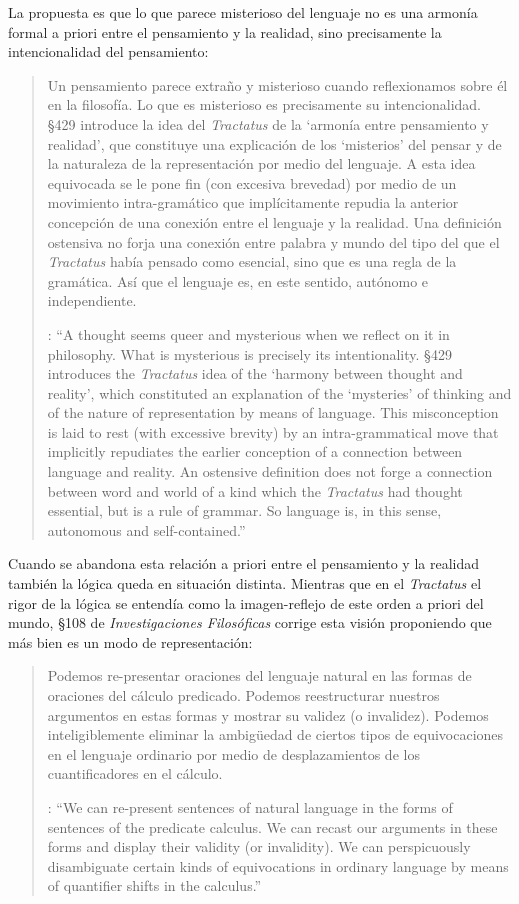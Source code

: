 La propuesta es que lo que parece misterioso del lenguaje no es una armonía formal a priori entre el pensamiento y la realidad, sino precisamente la intencionalidad del pensamiento: \blockquote[{\cite[4]{hacker2000mind}}: \enquote{A thought seems queer and mysterious when we reflect on it in philosophy. What is mysterious is precisely its intentionality. \S429 introduces the \emph{Tractatus} idea of the `harmony between thought and reality', which constituted an explanation of the `mysteries' of thinking and of the nature of representation by means of language. This misconception is laid to rest (with excessive brevity) by an intra-grammatical move that implicitly repudiates the earlier conception of a connection between language and reality. An ostensive definition does not forge a connection between word and world of a kind which the \emph{Tractatus} had thought essential, but is a rule of grammar. So language is, in this sense, autonomous and self-contained.}]{Un pensamiento parece extraño y misterioso cuando reflexionamos sobre él en la filosofía. Lo que es misterioso es precisamente su intencionalidad. \S429 introduce la idea del \emph{Tractatus} de la `armonía entre pensamiento y realidad', que constituye una explicación de los `misterios' del pensar y de la naturaleza de la representación por medio del lenguaje. A esta idea equivocada se le pone fin (con excesiva brevedad) por medio de un movimiento intra-gramático que implícitamente repudia la anterior concepción de una conexión entre el lenguaje y la realidad. Una definición ostensiva no forja una conexión entre palabra y mundo del tipo del que el \emph{Tractatus} había pensado como esencial, sino que es una regla de la gramática. Así que el lenguaje es, en este sentido, autónomo e independiente.}

Cuando se abandona esta relación a priori entre el pensamiento y la realidad también la lógica queda en situación distinta. Mientras que en el \emph{Tractatus} el rigor de la lógica se entendía como la imagen-reflejo de este orden a priori del mundo, \S108 de \emph{Investigaciones Filosóficas} corrige esta visión proponiendo que más bien es un modo de representación: \blockquote[{\cite[242]{bakerhacker2009understanding}}: \enquote{We can re-present sentences of natural language in the forms of sentences of the predicate calculus. We can recast our arguments in these forms and display their validity (or invalidity). We can perspicuously disambiguate certain kinds of equivocations in ordinary language by means of quantifier shifts in the calculus.}]{Podemos re-presentar oraciones del lenguaje natural en las formas de oraciones del cálculo predicado. Podemos reestructurar nuestros argumentos en estas formas y mostrar su validez (o invalidez). Podemos inteligiblemente eliminar la ambigüedad de ciertos tipos de equivocaciones en el lenguaje ordinario por medio de desplazamientos de los cuantificadores en el cálculo.}

